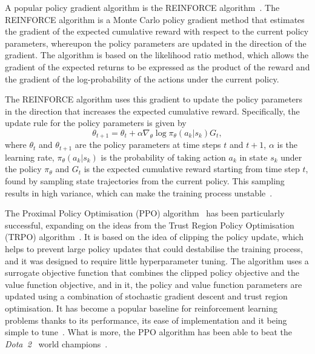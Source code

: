 A popular policy gradient algorithm is the REINFORCE algorithm~\autocite{williams1992}.
The REINFORCE algorithm is a Monte Carlo policy gradient method that estimates the gradient of the expected cumulative reward with respect to the current policy parameters, whereupon the policy parameters are updated in the direction of the gradient.
The algorithm is based on the likelihood ratio method, which allows the gradient of the expected returns to be expressed as the product of the reward and the gradient of the log-probability of the actions under the current policy.

The REINFORCE algorithm uses this gradient to update the policy parameters in the direction that increases the expected cumulative reward. Specifically, the update rule for the policy parameters is given by
\begin{equation}
    \theta_{t+1} = \theta_t + \alpha \nabla_{\theta} \log \pi_{\theta}(a_k|s_k) G_t,
\end{equation}
where $\theta_t$ and $\theta_{t+1}$ are the policy parameters at time steps $t$ and $t+1$, $\alpha$ is the learning rate, $\pi_{\theta}(a_k|s_k)$ is the probability of taking action $a_k$ in state $s_k$ under the policy $\pi_{\theta}$ and $G_t$ is the expected cumulative reward starting from time step $t$, found by sampling state trajectories from the current policy.
This sampling results in high variance, which can make the training process unstable~\autocite{arulkumaran2017}.

The Proximal Policy Optimisation (PPO) algorithm~\autocite{schulman2017} has been particularly successful, expanding on the ideas from the Trust Region Policy Optimisation (TRPO) algorithm~\autocite{schulman2015}.
It is based on the idea of clipping the policy update, which helps to prevent large policy updates that could destabilise the training process, and it was designed to require little hyperparameter tuning.
The algorithm uses a surrogate objective function that combines the clipped policy objective and the value function objective, and in it, the policy and value function parameters are updated using a combination of stochastic gradient descent and trust region optimisation.
It has become a popular baseline for reinforcement learning problems thanks to its performance, its ease of implementation and it being simple to tune~\autocite{schulman2017}.
What is more, the PPO algorithm has been able to beat the \textit{Dota~2}~\autocite{dota} world champions~\autocite{brockman2018,openai2019}.

